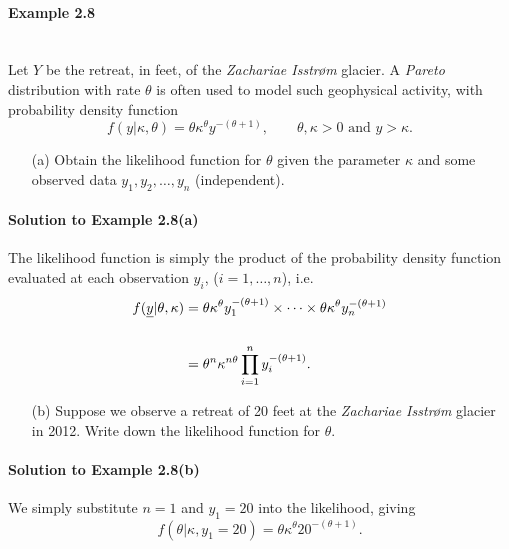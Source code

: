 \paragraph{Example 2.8}{~\\
Let $Y$ be the retreat, in feet, of the  \textit{Zachariae Isstr\o m} glacier.  A \textit{Pareto} distribution with rate $\theta$ is often used to model such geophysical activity, with probability density function 
$$
f(y|\kappa,\theta) = \theta\kappa^{\theta}y^{-(\theta+1)}, \qquad \theta,\kappa>0 \text{ and } y>\kappa.  
$$

\begin{itemize}
\item [(a)] Obtain the likelihood function for $\theta$ given the parameter $\kappa$ and some observed data $y_{1}, y_{2}, \ldots, y_{n}$ (independent).
\end{itemize}

\paragraph{Solution to Example 2.8(a)}{
    
    The likelihood function is simply the product of the probability density function evaluated at each observation $y_{i}$, ($i=1, \ldots, n$), i.e.
    \begin{align*}
    f(\underline{y} | \theta, \kappa) &= \theta\kappa^{\theta}y_{1}^{-(\theta+1)} \times \cdots \times \theta\kappa^{\theta}y_{n}^{-(\theta+1)}  \notag \\
                                   & \notag \\
                                   &= \theta^{n} \kappa^{n\theta} \prod_{i=1}^{n}y_{i}^{-(\theta+1)}.
    \end{align*}
    
    
}

\begin{itemize}
\item [(b)] Suppose we observe a retreat of 20 feet at the  \textit{Zachariae Isstr\o m} glacier in 2012.  Write down the likelihood function for $\theta$.
\end{itemize}

\paragraph{Solution to Example 2.8(b)}{
    
        We simply substitute $n=1$ and $y_{1}=20$ into the likelihood, giving
        $$
        f(\theta|\kappa,y_{1}=20)     =\theta \kappa^{\theta} 20^{-(\theta+1)}.
        $$
        
}}

